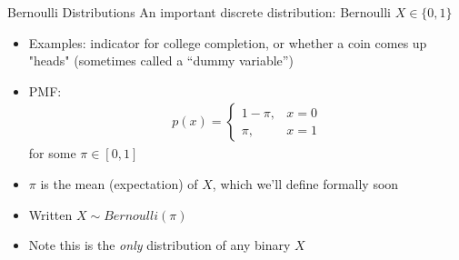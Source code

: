 \documentclass[11pt,english,handout]{beamer}
\begin{document}
\begin{frame}{Bernoulli Distributions}
\vspace{0.1cm}
An important discrete distribution: Bernoulli $X\in\{0,1\}$\pause{}

\begin{itemize}
\item Examples: indicator for college completion, or whether a coin comes up "heads" (sometimes called a ``dummy variable'')
\vspace{0.1cm}\pause{}
\item PMF: 
\vspace{-0.4cm}
\begin{align*}
p(x)=
\begin{cases}
1-\pi, & x=0\\
\pi, & x=1
\end{cases}
\end{align*}
for some $\pi\in[0,1]$
\vspace{0.1cm}\pause
\item $\pi$ is the mean (expectation) of $X$, which we'll define formally soon
\vspace{0.1cm}\pause{}
\item Written $X\sim Bernoulli(\pi)$
\vspace{0.1cm}\pause{}
\item Note this is the \emph{only} distribution of any binary $X$
\end{itemize}

\end{frame}
\end{document}
